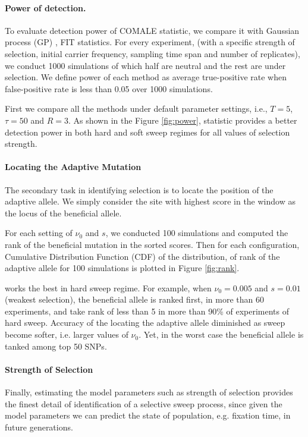 \documentclass[11pt]{article}
\def\comale{\text{COMALE }}
\begin{document}
\paragraph{Power of detection.}
To evaluate detection power of COMALE statistic, we 
compare it with Gaussian process (GP) \cite{Terhorst2015Multi}, FIT 
\cite{feder2014Identifying} statistics. 
For every experiment, (with a specific strength of selection, initial carrier 
frequency, 
sampling time span and number of replicates), we conduct 1000 simulations of 
which half are neutral and the rest are under selection. We define power of 
each method as average true-positive rate when 
false-positive rate is less than 0.05 over 1000 simulations.

First we compare all the methods under default parameter settings, i.e., 
$T=5$, $\tau=50$ and $R=3$. As shown in the Figure \ref{fig:power}, \comale
statistic provides a better detection power in both hard and soft sweep regimes 
for all values of selection strength. 


\paragraph{Locating the Adaptive Mutation}
The secondary task in identifying selection is to locate the position of the 
adaptive allele. We simply consider the site with highest score in the window 
as the locus of the beneficial allele. 

For each setting of $\nu_0$ and $s$, we conducted 100 
simulations and computed the rank of the beneficial mutation in the sorted 
scores. Then for each configuration, Cumulative Distribution Function (CDF) of 
the distribution, of rank of the adaptive allele for 100 
simulations is plotted in Figure \ref{fig:rank}. 

\comale works the best in hard sweep regime. For example, 
when $\nu_0=0.005$ and $s=0.01$ (weakest selection), the beneficial allele is 
ranked first, in more than 60 experiments, and take rank of less than 5 in more 
than 90\% of experiments of hard sweep. Accuracy of the locating the adaptive 
allele diminished as sweep become softer, i.e. larger values of $\nu_0$. Yet, 
in the worst case the beneficial allele is tanked among top 50 SNPs.

\paragraph{Strength of  Selection}
Finally, estimating the model parameters such as strength of selection provides 
the finest detail of identification of a selective sweep process, since given 
the model parameters we can predict the state of population, e.g. fixation 
time, in future generations. 
\end{document}
